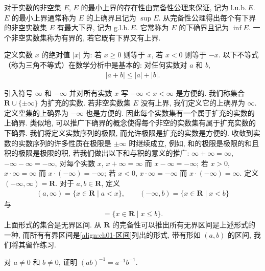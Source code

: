 \documentclass[../../main.tex]{subfiles}
\begin{document}
对于实数的非空集 $E$, $E$ 的最小上界的存在性由完备性公理来保证, 记为 l.u.b.\,$E$. $E$ 的最小上界通常称为 $E$ 的上确界且记为 $\sup E$. 从完备性公理得出每个有下界的非空实数集 $E$ 有最大下界, 记为 g.l.b.\,$E$. 它常称为 $E$ 的下确界且记为 $\inf E$. 一个非空实数集称为有界的, 若它既有下界又有上界.

\begin{proposition}[三角不等式]\label{proposition:ch01-三角不等式}
定义实数 $x$ 的绝对值 $|x|$ 为: 若 $x\geqslant 0$ 则等于 $x$, 若 $x<0$ 则等于 $-x$. 以下不等式（称为三角不等式）在数学分析中是基本的: 对任何实数对 $a$ 和 $b$,
\begin{align*}
|a+b|\leqslant |a|+|b|.
\end{align*}
\end{proposition}

\begin{definition}[扩充的实数]\label{definition:ch01-扩充实数}
引入符号 $\infty$ 和 $-\infty$ 并对所有实数 $x$ 写 $-\infty<x<\infty$ 是方便的. 我们称集合 $\mathbf{R}\cup\{\pm\infty\}$ 为扩充的实数. 若非空实数集 $E$ 没有上界, 我们定义它的上确界为 $\infty$. 定义空集的上确界为 $-\infty$ 也是方便的. 因此每个实数集有一个属于扩充的实数的上确界. 类似地, 可以推广下确界的概念使得每个非空的实数集有属于扩充实数的下确界. 我们将定义实数序列的极限, 而允许极限是扩充的实数是方便的. 收敛到实数的实数序列的许多性质在极限是 $\pm\infty$ 时继续成立, 例如, 和的极限是极限的和且积的极限是极限的积, 若我们做出以下和与积的意义的推广: $\infty+\infty=\infty$, $-\infty-\infty=-\infty$, 对每个实数 $x$, $x+\infty=\infty$ 而 $x-\infty=-\infty$; 若 $x>0$, $x\cdot\infty=\infty$ 而 $x\cdot(-\infty)=-\infty$; 若 $x<0$, $x\cdot\infty=-\infty$ 而 $x\cdot(-\infty)=\infty$. 定义 $(-\infty,\infty)=\mathbf{R}$. 对于 $a,b\in\mathbf{R}$, 定义
\begin{align*}
(a,\infty)=\{x\in\mathbf{R}\mid a<x\},\qquad (-\infty,b)=\{x\in\mathbf{R}\mid x<b\}
\end{align*}
与
\begin{align*}
[a,\infty)=\{x\in\mathbf{R}\mid a\leqslant x\},\qquad (-\infty,b]=\{x\in\mathbf{R}\mid x\leqslant b\}.
\end{align*}
上面形式的集合是无界区间. 从 $\mathbf{R}$ 的完备性可以推出所有无界区间是上述形式的一种, 而所有有界区间是\eqref{align:ch01-区间}列出的形式, 带有形如 $(a,b)$ 的区间, 我们将其留作练习.
\end{definition}

\begin{exercise}\label{exercise:ch01-01}
对 $a\neq 0$ 和 $b\neq 0$, 证明 $(ab)^{-1}=a^{-1}b^{-1}$.
\end{exercise}
\end{document}
